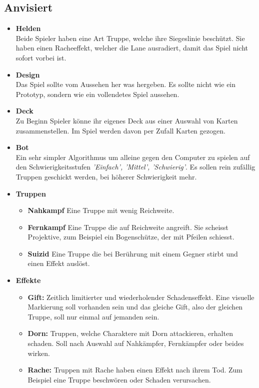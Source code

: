 \subsection*{Anvisiert}
\begin{itemize}
    \item \textbf{Helden} \\
        Beide Spieler haben eine Art Truppe, welche ihre Siegeslinie beschützt. Sie haben einen Racheeffekt, welcher die
        Lane ausradiert, damit das Spiel nicht sofort vorbei ist.
    \item \textbf{Design} \\
        Das Spiel sollte vom Aussehen her was hergeben. Es sollte nicht wie ein Prototyp, sondern wie ein 
        vollendetes Spiel aussehen. 
    \item \textbf{Deck} \\
        Zu Beginn Spieler könne ihr eigenes Deck aus einer Auswahl von Karten zusammenstellen. Im Spiel werden davon per Zufall Karten gezogen.
    \item \textbf{Bot} \\
        Ein sehr simpler Algorithmus um alleine gegen den Computer zu spielen auf den Schwierigkeitsstufen \textit{'Einfach', 'Mittel', 'Schwierig'}.
        Es sollen rein zufällig Truppen geschickt werden, bei höherer Schwierigkeit mehr.
    \item \textbf{Truppen}
    \begin{itemize}
        \item \textbf{Nahkampf}
            Eine Truppe mit wenig Reichweite.
        \item \textbf{Fernkampf}
            Eine Truppe die auf Reichweite angreift. Sie scheisst Projektive, zum Beispiel ein Bogenschütze,
            der mit Pfeilen schiesst.
        \item \textbf{Suizid}
            Eine Truppe die bei Berührung mit einem Gegner stirbt und einen Effekt auslöst.
    \end{itemize}
    \item \textbf{Effekte}
    \begin{itemize}
        \item \textbf{Gift:}
            Zeitlich limitierter und wiederholender Schadenseffekt. Eine visuelle Markierung soll vorhanden sein
            und das gleiche Gift, also der gleichen Truppe, soll nur einmal auf jemanden sein.
        \item \textbf{Dorn:}
            Truppen, welche Charaktere mit Dorn attackieren, erhalten schaden. Soll nach Auswahl auf Nahkämpfer,
            Fernkämpfer oder beides wirken.
        \item \textbf{Rache:}
            Truppen mit Rache haben einen Effekt nach ihrem Tod. Zum Beispiel eine Truppe beschwören oder Schaden verursachen.
    \end{itemize}
\end{itemize}

